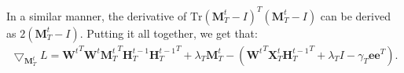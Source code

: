 \documentclass[a4paper,10pt]{article}
\newcommand{\W}{\textbf{W}^t}
\newcommand{\MT}{\textbf{M}^t_T}
\newcommand{\HTtt}{\textbf{H}^{t-1}_T}
\newcommand{\XT}{\textbf{X}^t_T}
\newcommand{\0}{\textbf{0}}
\newcommand{\e}{\textbf{e}}
\begin{document}
In a similar manner, the derivative of $\text{Tr}(\MT - I)^T(\MT - I)$ can be derived as $2(\MT-I)$.  Putting it all together, we get that:
\begin{equation}
\begin{split}
\bigtriangledown_{\MT}L = {\W}^T\W{\MT}^T\HTtt{\HTtt}^T + \lambda_T{\MT} - \left({\W}^T\XT{\HTtt}^T + \lambda_T I - \gamma_T\e{\e}^T\right).
\end{split}
\end{equation}


\end{document}
